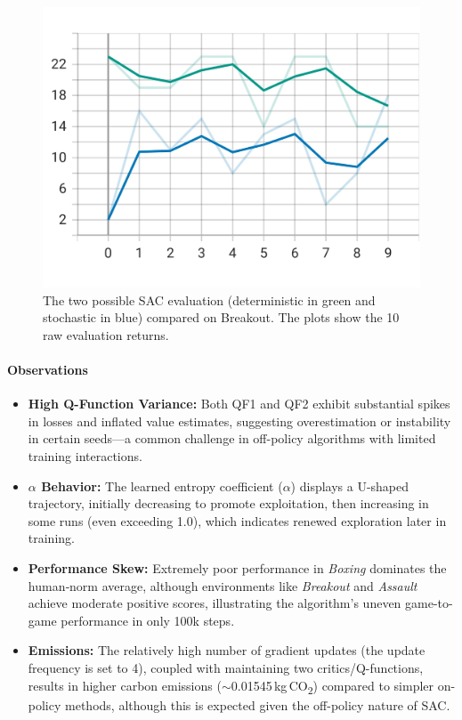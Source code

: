 \begin{figure}
	\centering
	\includegraphics[width=.5\textwidth]{figures/sac/eval_episodic_return_deterministic_vs_stochastic.jpeg}
	\caption{The two possible SAC evaluation (deterministic in green and stochastic in blue) compared on Breakout. The plots show the 10 raw evaluation returns.}
	\label{fig:eval_episodic_return_deterministic_vs_stochastic}
\end{figure}

\paragraph{Observations}
\begin{itemize}
	\item \textbf{High Q-Function Variance:} Both QF1 and QF2 exhibit substantial spikes in losses and inflated value estimates, suggesting overestimation or instability in certain seeds—a common challenge in off-policy algorithms with limited training interactions.
	\item \textbf{$\alpha$ Behavior:} The learned entropy coefficient ($\alpha$) displays a U-shaped trajectory, initially decreasing to promote exploitation, then increasing in some runs (even exceeding 1.0), which indicates renewed exploration later in training.
	\item \textbf{Performance Skew:} Extremely poor performance in \emph{Boxing} dominates the human‐norm average, although environments like \emph{Breakout} and \emph{Assault} achieve moderate positive scores, illustrating the algorithm's uneven game-to-game performance in only 100k steps.
	\item \textbf{Emissions:} The relatively high number of gradient updates (the update frequency is set to 4), coupled with maintaining two critics/Q-functions, results in higher carbon emissions ($\sim$\num{0.01545}\,kg\,CO\textsubscript{2}) compared to simpler on-policy methods, although this is expected given the off-policy nature of SAC.
\end{itemize}

